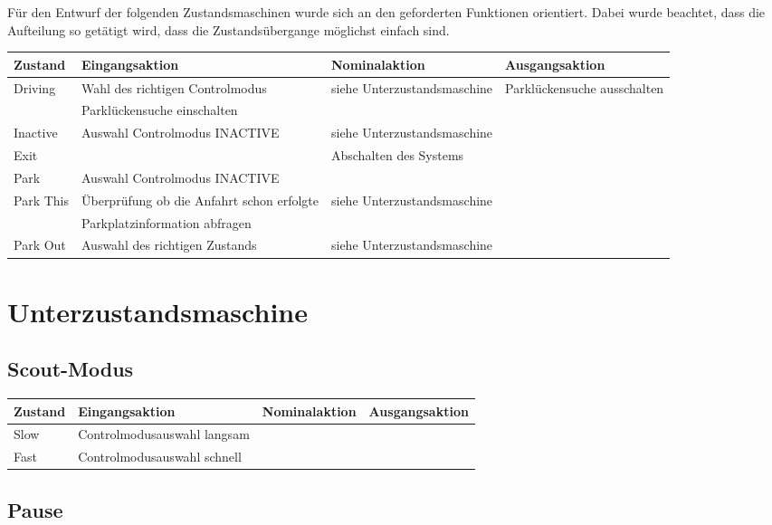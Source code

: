 Für den Entwurf der folgenden Zustandsmaschinen wurde sich an den geforderten Funktionen orientiert. Dabei wurde beachtet, dass die Aufteilung so getätigt wird, dass die Zustandsübergange möglichst einfach sind.

\begin{tabular}{|p{1.5cm}|p{4cm}|p{3.8cm}|p{3cm}|}
	\hline 
	Zustand & Eingangsaktion & Nominalaktion & Ausgangsaktion \\ 
	\hline 
	Driving & Wahl des richtigen Controlmodus & siehe Unterzustandsmaschine & Parklückensuche ausschalten \\ 
	\hline 
	 & Parklückensuche einschalten &  &  \\ 
	\hline
	Inactive & Auswahl Controlmodus INACTIVE & siehe Unterzustandsmaschine &  \\ 
	\hline 
	Exit &  & Abschalten des Systems &  \\ 
	\hline
	Park & Auswahl Controlmodus INACTIVE &  &  \\ 
	\hline
	Park This & Überprüfung ob die Anfahrt schon erfolgte & siehe Unterzustandsmaschine &  \\ 
	\hline
	 & Parkplatzinformation abfragen &  &  \\ 
	\hline
	Park Out & Auswahl des richtigen Zustands & siehe Unterzustandsmaschine &  \\ 
	\hline 	
\end{tabular} 


\section{Unterzustandsmaschine}

\subsection{Scout-Modus}

\begin{tabular}{|p{1.5cm}|p{4cm}|p{4cm}|p{3cm}|}
	\hline 
	Zustand & Eingangsaktion & Nominalaktion & Ausgangsaktion \\ 
	\hline 
	Slow & Controlmodusauswahl langsam &  &  \\ 
	\hline 
	Fast & Controlmodusauswahl schnell &  &  \\ 
	\hline 
\end{tabular} 

\subsection{Pause}

